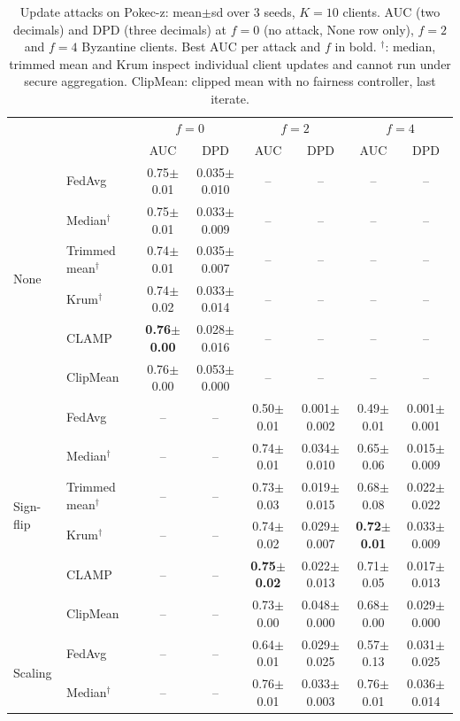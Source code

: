 \begin{table}[tbp]
\centering
\scriptsize
\setlength{\tabcolsep}{2pt}
\caption{Update attacks on Pokec-z: mean$\pm$sd over 3 seeds, $K=10$ clients. AUC (two decimals) and DPD (three decimals) at $f=0$ (no attack, None row only), $f=2$ and $f=4$ Byzantine clients. Best AUC per attack and $f$ in bold. $^\dagger$: median, trimmed mean and Krum inspect individual client updates and cannot run under secure aggregation. ClipMean: clipped mean with no fairness controller, last iterate.}
\label{tab:e3_pokec}
\begin{tabular}{llcccccc}
\toprule
 & & \multicolumn{2}{c}{$f=0$} & \multicolumn{2}{c}{$f=2$} & \multicolumn{2}{c}{$f=4$} \\
 & & AUC & DPD & AUC & DPD & AUC & DPD \\
\midrule
\multirow{6}{*}{None} & FedAvg & 0.75$\pm$0.01 & 0.035$\pm$0.010 & -- & -- & -- & -- \\
 & Median$^\dagger$ & 0.75$\pm$0.01 & 0.033$\pm$0.009 & -- & -- & -- & -- \\
 & Trimmed mean$^\dagger$ & 0.74$\pm$0.01 & 0.035$\pm$0.007 & -- & -- & -- & -- \\
 & Krum$^\dagger$ & 0.74$\pm$0.02 & 0.033$\pm$0.014 & -- & -- & -- & -- \\
 & CLAMP & \textbf{0.76$\pm$0.00} & 0.028$\pm$0.016 & -- & -- & -- & -- \\
 & ClipMean & 0.76$\pm$0.00 & 0.053$\pm$0.000 & -- & -- & -- & -- \\
\midrule
\multirow{6}{*}{Sign-flip} & FedAvg & -- & -- & 0.50$\pm$0.01 & 0.001$\pm$0.002 & 0.49$\pm$0.01 & 0.001$\pm$0.001 \\
 & Median$^\dagger$ & -- & -- & 0.74$\pm$0.01 & 0.034$\pm$0.010 & 0.65$\pm$0.06 & 0.015$\pm$0.009 \\
 & Trimmed mean$^\dagger$ & -- & -- & 0.73$\pm$0.03 & 0.019$\pm$0.015 & 0.68$\pm$0.08 & 0.022$\pm$0.022 \\
 & Krum$^\dagger$ & -- & -- & 0.74$\pm$0.02 & 0.029$\pm$0.007 & \textbf{0.72$\pm$0.01} & 0.033$\pm$0.009 \\
 & CLAMP & -- & -- & \textbf{0.75$\pm$0.02} & 0.022$\pm$0.013 & 0.71$\pm$0.05 & 0.017$\pm$0.013 \\
 & ClipMean & -- & -- & 0.73$\pm$0.00 & 0.048$\pm$0.000 & 0.68$\pm$0.00 & 0.029$\pm$0.000 \\
\midrule
\multirow{6}{*}{Scaling} & FedAvg & -- & -- & 0.64$\pm$0.01 & 0.029$\pm$0.025 & 0.57$\pm$0.13 & 0.031$\pm$0.025 \\
 & Median$^\dagger$ & -- & -- & 0.76$\pm$0.01 & 0.033$\pm$0.003 & 0.76$\pm$0.01 & 0.036$\pm$0.014 \\

\end{tabular}
\end{table}
